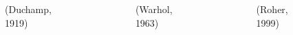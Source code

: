 \documentclass[aspectratio=169]{beamer}
\begin{document}
\begin{frame}

\begin{columns}[b]
  \begin{figure}
    \centering
    \includegraphics[height = 1.8in]{figures/monalisa_duchamp}
  \end{figure} 
  \begin{center} 
  (Duchamp, 1919)
  \end{center}

\pause

  \begin{figure}
    \centering
    \includegraphics[height = 1.8in]{figures/monalisa_warhol}
  \end{figure} 
  \begin{center}
  (Warhol, 1963)
  \end{center}

\pause

  \begin{figure}
  \centering
  \includegraphics[height = 1.8in]{figures/monalisa_newyorker}
  \end{figure}
  \begin{center}
  (Roher, 1999)
  \end{center}
\end{columns}

\end{frame}
\end{document}
